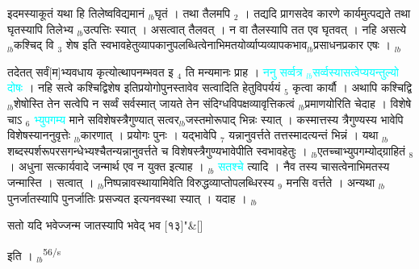 \documentclass[article,12pt,a4paper]{memoir}%
\newcommand{\quotelemma}[1]{\textcolor{cyan}{#1}}
\newcounter{parCount}
\begin{document}
इदमस्याकूतं यथा हि तिलेष्वविद्यमानं {\tiny $_{lb}$}घृतं । तथा तैलमपि {\tiny $_{2}$} । तद्यदि प्रागसदेव कारणे कार्यमुत्पद्यते तथा घृतस्यापि तिलेभ्य {\tiny $_{lb}$}उत्पत्तिः स्यात् । असत्वात् तैलवत् । न वा तैलस्यापि तत एव घृतवत् । नहि असत्ये {\tiny $_{lb}$}कश्चिद् वि {\tiny $_{3}$} शेष इति स्वभावहेतुव्यापकानुपलब्धित्वेनाभिमतयोर्व्याप्यव्यापकभाव{\tiny $_{lb}$}प्रसाधनप्रकार एषः ।
	{}
	\pend%
      {\tiny $_{lb}$}

	  
	  \pstart \leavevmode%
	तदेतत् सर्वं[म]भ्यवधाय कृत्योत्थापनम्भवत इ {\tiny $_{4}$} ति मन्यमानः प्राह । \quotelemma{ननु सर्व्वत्र {\tiny $_{lb}$}सर्व्वस्यासत्वेप्ययन्तुल्यो दोषः} \cite[5b10]{vn-msN} । नहि सत्वे कश्चिद्विशेष इतिप्रयोगोपुनस्तावेव सत्वादिति हेतुविपर्ययं {\tiny $_{5}$} कृत्वा कार्यौ । अथापि कश्चिद्वि{\tiny $_{lb}$}शेषोस्ति तेन सत्वेपि न सर्व्वं सर्वस्मात् जायते तेन संदिग्धविपक्षव्यावृत्तिकत्वं {\tiny $_{lb}$}प्रमाणयोरिति चेदाह । विशेषे चाऽ {\tiny $_{6}$} \quotelemma{भ्युपगम्य} माने सविशेषस्त्रैगुण्यात् सत्वर{\tiny $_{lb}$}जस्तमोरूपाद् भिन्नः स्यात् । कस्मात्तस्य त्रैगुण्यस्य भावेपि विशेषस्याननुवृत्तेः {\tiny $_{lb}$}कारणात् । प्रयोगः पुनः । यद्भावेपि {\tiny $_{7}$} यन्नानुवर्त्तते तत्तस्मादत्यन्तं भिन्नं । यथा {\tiny $_{lb}$}शब्दस्पर्शरूपरसगन्धेभ्यश्चैतन्यन्नानुवर्त्तते च विशेषस्त्रैगुण्यभावेपीति स्वभावहेतुः । {\tiny $_{lb}$}एतच्चाभ्युपगम्योद्ग्राहितं {\tiny $_{8}$} । अधुना सत्कार्यवादे जन्मार्थ एव न युक्त इत्याह । {\tiny $_{lb}$} \quotelemma{सतश्चे} \cite[5b10]{vn-msN} त्यादि । नैव तस्य चासत्वेनाभिमतस्य जन्मास्ति । सत्वात् । {\tiny $_{lb}$}निष्पन्नावस्थायामिवेति विरुद्धव्याप्तोपलब्धिरस्य {\tiny $_{9}$} \leavevmode{} मनसि वर्त्तते । अन्यथा {\tiny $_{lb}$}पुनर्जातस्यापि पुनर्जातिः प्रसज्यत इत्यनवस्था स्यात् । यदाह । {\tiny $_{lb}$} 
	    \pend%
	  
	    
	    \stanza[\smallbreak]
	  सतो यदि भवेज्जन्म जातस्यापि भवेद् भव [१३]{\normalfontlatin\large\qquad{}"}\&[\smallbreak]
	  
	  
	  
	    \pstart  \leavevmode%
	    \hphantom{.}
	   इति ।
	{}
	\pend%
      {\tiny $_{lb}$}\textsuperscript{\textenglish{56/s}}
\end{document}
